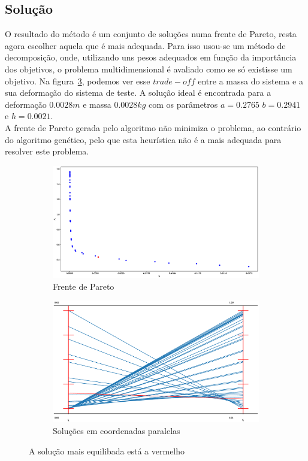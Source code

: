 \documentclass[a4paper,12pt]{article}
\begin{document}
\subsection{Solução}

O resultado do método é um conjunto de soluções numa frente de Pareto, resta agora escolher aquela que é mais adequada. Para isso usou-se um método de decomposição, onde, utilizando uns pesos adequados em função da importância dos objetivos, o problema multidimensional é avaliado como se só existisse um objetivo. Na figura~\ref{fig:defIm2}, podemos ver esse $trade-off$ entre a massa do sistema e a sua deformação do sistema de teste. A solução ideal é encontrada para a deformação $0.0028m$ e massa $0.0028kg$ com os parâmetros $a = 0.2765$ $b = 0.2941$ e $h = 0.0021$. \\
A frente de Pareto gerada pelo algoritmo não minimiza o problema, ao contrário do algoritmo genético, pelo que esta heurística não é a mais adequada para resolver este problema.



\begin{figure}[!htbp]
\centering
\begin{subfigure}{.5\textwidth}
  \centering
  \includegraphics[width=.99\linewidth]{PS_objSpace.eps}
  \caption{Frente de Pareto}
  \label{fig:sub1}
\end{subfigure}%
\begin{subfigure}{.5\textwidth}
  \centering
  \includegraphics[width=.99\linewidth]{PS_parallel_coord.eps}
  \caption{Soluções em coordenadas paralelas}
  \label{fig:sub2}
\end{subfigure}
\caption{\label{fig:defIm2}A solução mais equilibada está a vermelho}
\end{figure}
\end{document}
